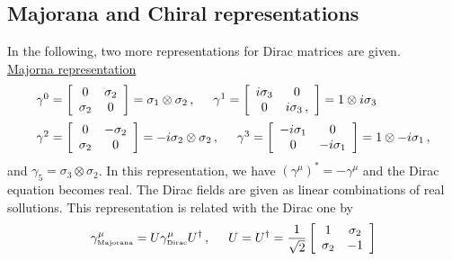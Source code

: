 \subsection{Majorana and Chiral representations}

In the following, two more representations 
for Dirac matrices are given.\\
\noindent
\underline{Majorna representation}\\
\begin{eqnarray}
\begin{array}{l}
\gamma^0
=
\left[
\begin{array}{cc}
0 & \sigma_2 \\ \sigma_2 & 0
\end{array}
\right]
= \sigma_1 \otimes \sigma_2
\,,
\hspace{5mm}
\gamma^1
=
\left[
\begin{array}{cc}
i\sigma_3 & 0 \\  0 & i\sigma_3\,,
\end{array}
\right]
=
1 \otimes i\sigma_3
\vspace{2mm}
\\ %
\gamma^2
=
\left[
\begin{array}{cc}
0 & -\sigma_2 \\ \sigma_2 & 0
\end{array}
\right]
= -i\sigma_2 \otimes \sigma_2
\,,
\hspace{5mm}
\gamma^3
=
\left[
\begin{array}{cc}
-i\sigma_1 & 0 \\  0 & -i\sigma_1
\end{array}
\right]
=
1 \otimes -i\sigma_1\,,
\end{array}
\end{eqnarray}
and $\gamma_5 = \sigma_3 \otimes \sigma_2$.
In this representation, we have $(\gamma^\mu)^* = - \gamma^\mu$ and
the Dirac equation becomes real. The Dirac fields are given as linear combinations
of real sollutions. This representation is related with the Dirac one by
\begin{eqnarray}
\gamma^\mu_{\mbox{\tiny Majorana}}
= U \gamma^\mu_{\mbox{\tiny Dirac}} U^{\dagger}\,,
\hspace{5mm}
U = U^\dagger =
\frac{1}{\sqrt{2}}
\left[
\begin{array}{cc}
1 & \sigma_2 \\
\sigma_2 & -1
\end{array}
\right]
\end{eqnarray}\\

